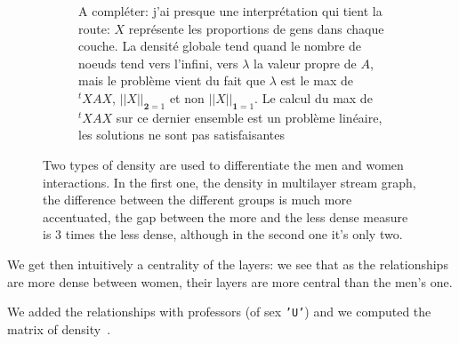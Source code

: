 \documentclass{svproc}
\begin{document}
\begin{figure}
\begin{subfigure}{0.45\textwidth}
	\label{fig:matrixD}
	\caption{A compléter: j'ai presque une interprétation qui tient la route: $X$ représente les proportions de gens dans chaque couche. La densité globale tend quand le nombre de noeuds tend vers l'infini, vers $\lambda$ la valeur propre de $A$, mais le problème vient du fait que $\lambda$ est le max de $^tXAX$, $||X||_{\textbf{2}=1}$ et non $||X||_{\textbf{1}=1}$. Le calcul du max de $^tXAX$ sur ce dernier ensemble est un problème linéaire, les solutions ne sont pas satisfaisantes  }
\end{subfigure}
	\label{fig:dens}
	
	\caption{Two types of density are used to differentiate the men and women interactions. In the first one, the density in multilayer stream graph, the difference between the different groups is much more accentuated, the gap between the more and the less dense measure is 3 times the less dense, although in the second one it's only two.  }
	
\end{figure}

We get then intuitively a centrality of the layers: we see that as the relationships are more dense between women, their layers are more central than the men's one.

We added the relationships with professors (of sex \texttt{'U'}) and we computed the matrix of density~\cite{fig:matrixD}.
\end{document}
